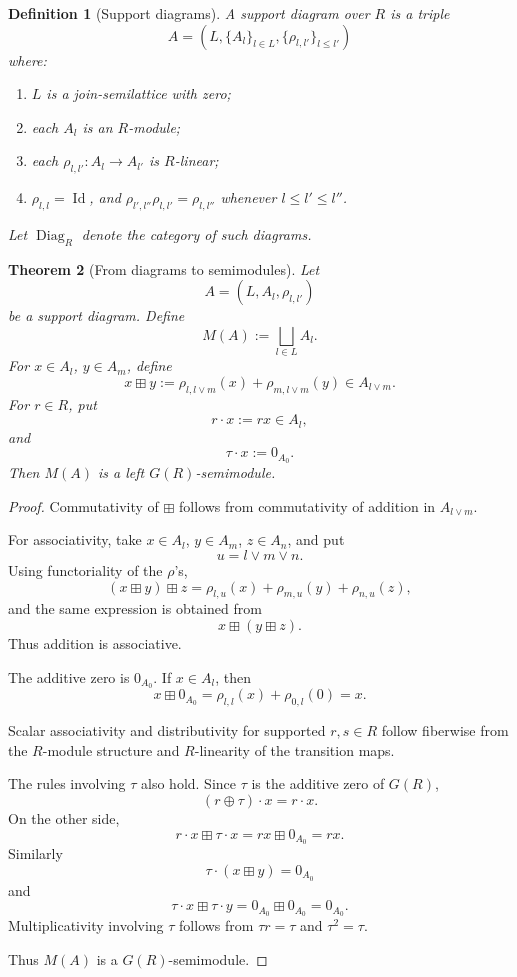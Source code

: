 \documentclass[11pt]{article}
\newtheorem{theorem}{Theorem}[section]
\newtheorem{definition}[theorem]{Definition}
\newcommand{\Diag}{\operatorname{Diag}}
\newcommand{\Id}{\operatorname{Id}}
\begin{document}
\begin{definition}[Support diagrams]
A support diagram over \(R\) is a triple
\[
A=(L,\{A_l\}_{l\in L},\{\rho_{l,l'}\}_{l\le l'})
\]
where:
\begin{enumerate}[label=(\roman*)]
\item \(L\) is a join-semilattice with zero;
\item each \(A_l\) is an \(R\)-module;
\item each \(\rho_{l,l'}:A_l\to A_{l'}\) is \(R\)-linear;
\item \(\rho_{l,l}=\Id\), and \(\rho_{l',l''}\rho_{l,l'}=\rho_{l,l''}\) whenever \(l\le l'\le l''\).
\end{enumerate}
Let \(\Diag_R\) denote the category of such diagrams.
\end{definition}

\begin{theorem}[From diagrams to semimodules]
Let
\[
A=(L,A_l,\rho_{l,l'})
\]
be a support diagram. Define
\[
M(A):=\bigsqcup_{l\in L}A_l.
\]
For \(x\in A_l\), \(y\in A_m\), define
\[
x\boxplus y
:=
\rho_{l,l\vee m}(x)+\rho_{m,l\vee m}(y)
\in A_{l\vee m}.
\]
For \(r\in R\), put
\[
r\cdot x:=rx\in A_l,
\]
and
\[
\tau\cdot x:=0_{A_0}.
\]
Then \(M(A)\) is a left \(G(R)\)-semimodule.
\end{theorem}

\begin{proof}
Commutativity of \(\boxplus\) follows from commutativity of addition in \(A_{l\vee m}\).

For associativity, take \(x\in A_l\), \(y\in A_m\), \(z\in A_n\), and put
\[
u=l\vee m\vee n.
\]
Using functoriality of the \(\rho\)'s,
\[
(x\boxplus y)\boxplus z
=
\rho_{l,u}(x)+\rho_{m,u}(y)+\rho_{n,u}(z),
\]
and the same expression is obtained from
\[
x\boxplus(y\boxplus z).
\]
Thus addition is associative.

The additive zero is \(0_{A_0}\). If \(x\in A_l\), then
\[
x\boxplus0_{A_0}
=
\rho_{l,l}(x)+\rho_{0,l}(0)=x.
\]

Scalar associativity and distributivity for supported \(r,s\in R\) follow fiberwise from the \(R\)-module structure and \(R\)-linearity of the transition maps.

The rules involving \(\tau\) also hold. Since \(\tau\) is the additive zero of \(G(R)\),
\[
(r\oplus\tau)\cdot x=r\cdot x.
\]
On the other side,
\[
r\cdot x\boxplus \tau\cdot x
=
r x\boxplus 0_{A_0}=rx.
\]
Similarly
\[
\tau\cdot(x\boxplus y)=0_{A_0}
\]
and
\[
\tau\cdot x\boxplus\tau\cdot y=0_{A_0}\boxplus0_{A_0}=0_{A_0}.
\]
Multiplicativity involving \(\tau\) follows from \(\tau r=\tau\) and \(\tau^2=\tau\).

Thus \(M(A)\) is a \(G(R)\)-semimodule.
\end{proof}
\end{document}
